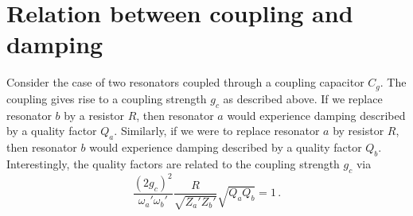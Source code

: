\documentclass{article}
\begin{document}
\section{Relation between coupling and damping}

Consider the case of two resonators coupled through a coupling capacitor $C_g$.
The coupling gives rise to a coupling strength $g_c$ as described above.
If we replace resonator $b$ by a resistor $R$, then resonator $a$ would experience damping described by a quality factor $Q_a$.
Similarly, if we were to replace resonator $a$ by resistor $R$, then resonator $b$ would experience damping described by a quality factor $Q_b$.
Interestingly, the quality factors are related to the coupling strength $g_c$ via
\begin{equation*}
  \frac{(2 g_c)^2}{\omega_a' \omega_b'} \frac{R}{\sqrt{Z_a' Z_b'}} \sqrt{Q_a Q_b} = 1 \, .
\end{equation*}
\end{document}
